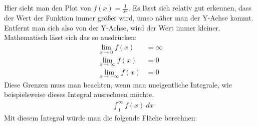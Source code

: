 \begin{flushleft}
    Hier sieht man den Plot von $f(x)=\frac{1}{x^2}$.
    Es lässt sich relativ gut erkennen, dass der Wert der Funktion immer größer wird, umso näher man der Y-Achse kommt.
    Entfernt man sich also von der Y-Achse, wird der Wert immer kleiner.
    Mathematisch lässt sich das so ausdrücken:
    \begin{align}
        \lim_{x \to 0} f(x) &= \infty \\
        \lim_{x \to \infty} f(x) &= 0 \\
        \lim_{x \to -\infty} f(x) &= 0
    \end{align}
    Diese Grenzen muss man beachten, wenn man uneigentliche Integrale, wie beispielsweise dieses Integral ausrechnen möchte.
    \begin{align}
        &\int_{1}^{\infty} f(x) \ dx
    \end{align}
    Mit diesem Integral würde man die folgende Fläche berechnen:
\end{flushleft}

\begin{center}
\end{center}

